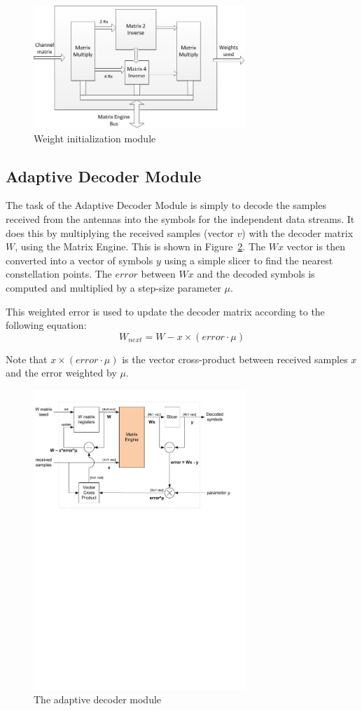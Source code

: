 \documentclass[journal]{IEEEtran}
\begin{document}
\begin{figure}
\centering
\includegraphics*[width=8cm]{images/initialize_weights.jpg}
\caption{Weight initialization module}
\label{initialize_weights}
\end{figure}

\subsection{Adaptive Decoder Module}

The task of the Adaptive Decoder Module is simply to decode the samples received from the antennas into the symbols for the independent data streams. It does this by multiplying the received samples (vector $v$) with the decoder matrix $W$, using the Matrix Engine. This is shown in Figure~\ref{adaptive_decoder}. The $Wx$ vector is then converted into a vector of symbols $y$ using a simple slicer to find the nearest constellation points. The $error$ between $Wx$ and the decoded symbols is computed and multiplied by a step-size parameter $\mu$.

This weighted error is used to update the decoder matrix according to the following equation:
\[ W_{next} = W - x \times (error \cdot \mu) \]

Note that $x \times (error \cdot \mu)$ is the vector cross-product between received samples $x$ and the error weighted by $\mu$.
\begin{figure}[!h]
\centering
\includegraphics*[width=8cm, viewport = 0 510 560 810]{images/adaptive_decoder.pdf}
\caption{The adaptive decoder module}
\label{adaptive_decoder}
\end{figure}
\end{document}
